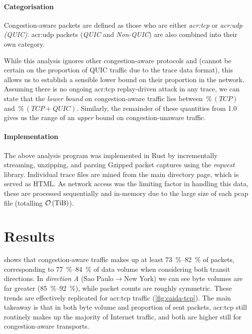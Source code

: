 \paragraph{Categorisation}
Congestion-aware packets are defined as those who are either \emph{\gls{acr:tcp}} or \emph{\gls{acr:udp} (QUIC)}.
\gls{acr:udp} packets (\emph{QUIC} and \emph{Non-QUIC}) are also combined into their own category.

While this analysis ignores other congestion-aware protocols and (cannot be certain on the proportion of QUIC traffic due to the trace data format), this allows us to establish a sensible lower bound on their proportion in the network.
Assuming there is no ongoing \gls{acr:tcp} replay-driven attack in any trace, we can state that the \emph{lower bound} on congestion-aware traffic lies between $\operatorname{\%}(\mathit{TCP})$ and $\operatorname{\%}(\mathit{TCP} + \mathit{QUIC})$.
Similarly, the remainder of these quantities from \num{1.0} gives us the range of an \emph{upper} bound on congestion-unaware traffic.

\paragraph{Implementation}
The above analysis program was implemented in Rust by incrementally streaming, unzipping, and parsing Gzipped packet captures using the \emph{reqwest} library.
Individual trace files are mined from the main directory page, which is served as HTML.
As network access was the limiting factor in handling this data, these are processed sequentially and in-memory due to the large size of each pcap file (totalling $\mathcal{O}\left(\unit{\tebi\byte}\right)$).

\section{Results}
 shows that congestion-aware traffic makes up at least \qtyrange{73}{82}{\percent} of packets, corresponding to \qtyrange{77}{84}{\percent} of data volume when considering both transit directions.
In \emph{direction A} (Sao Paulo$\rightarrow$New York) we can see byte volumes are far greater (\qtyrange{85}{92}{\percent}), while packet counts are roughly symmetric.
These trends are effectively replicated for \gls{acr:tcp} traffic (\cref{fig:caida-tcp}).
The main takeaway is that in both byte volume and proportion of sent packets, \gls{acr:tcp} still routinely makes up the majority of Internet traffic, and both are higher still for congestion-aware transports.

